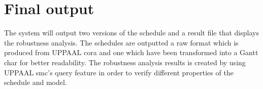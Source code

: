 \section{Final output}\label{sec:final}
The system will output two versions of the schedule and a result file that displays the robustness analysis. The schedules are outputted a raw format which is produced from UPPAAL \gls{cora} and one which have been transformed into a Gantt char for better readability. The robustness analysis results is created by using UPPAAL \gls{smc}'s query feature in order to verify different properties of the schedule and model.




